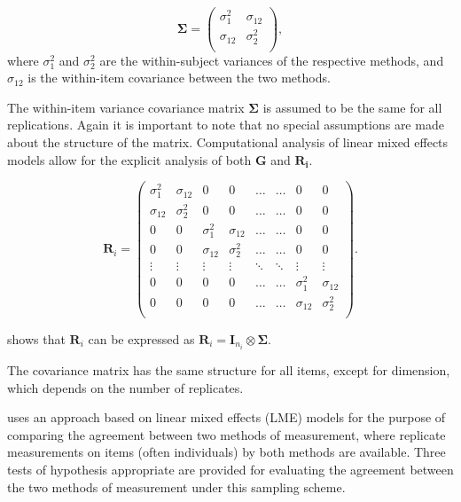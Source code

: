 \documentclass[12pt, a4paper]{report}
\theoremstyle{plain}
\theoremstyle{definition}
\theoremstyle{remark}
\begin{document}
		\[
		\boldsymbol{\Sigma} = \left( \begin{array}{cc}
		\sigma^2_{1} & \sigma_{12} \\
		\sigma_{12} & \sigma^2_{2} \\
		\end{array}\right),
		\]
		where $\sigma^2_{1}$ and $\sigma^2_{2}$ are the within-subject variances of the respective methods, and $\sigma_{12}$ is the within-item covariance between the two methods. 
		
		The within-item variance covariance matrix $\boldsymbol{\Sigma}$ is assumed to be the same for all replications.  Again it is important to note that no special assumptions are made about the structure of the matrix. Computational analysis of linear mixed effects models allow for the explicit analysis of both $\boldsymbol{G}$ and $\boldsymbol{R_i}$.
		
		\[ \boldsymbol{R}_i =\left(
		\begin{array}{cccccccc}
		\sigma^2_1  & \sigma_{12} & 0 & 0 & \ldots & \ldots & 0 & 0 \\
		\sigma_{12} & \sigma^2_2  & 0 & 0  & \ldots & \ldots & 0 & 0\\
		
		0 & 0 &\sigma^2_1  & \sigma_{12} & \ldots & \ldots& 0 &  0 \\
		0 & 0 &\sigma_{12} & \sigma^2_2  & \ldots & \ldots & 0 & 0 \\
		\vdots & \vdots &\vdots & \vdots & \ddots & \ddots& \vdots & \vdots \\
		
		0 & 0 &0 & 0 & \ldots & \ldots&\sigma^2_1  & \sigma_{12} \\
		0 & 0 &0 & 0 & \ldots & \ldots &\sigma_{12} & \sigma^2_2 \\
		\end{array}
		\right). \]
		
		
		\citet{hamlett} shows that $\boldsymbol{R}_{i}$  can be expressed as $\boldsymbol{R}_{i} = \boldsymbol{I}_{n_{i}} \otimes \boldsymbol{\Sigma}$. 
		
		
		
		
		The covariance matrix has the same structure for all items, except for dimension, which depends on the number of replicates. 
		
		
		
	\citet{ARoy2009} uses an approach based on linear mixed effects (LME) models for the purpose of comparing the agreement between two methods of measurement, where replicate measurements on items (often individuals) by both methods are available. Three tests of hypothesis appropriate are provided for evaluating the agreement between the two methods of measurement under this sampling scheme. 
	
\end{document}
